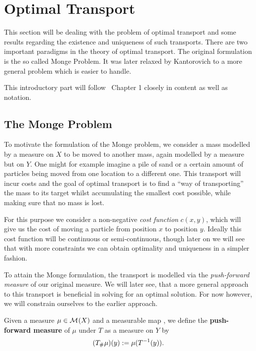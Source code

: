 \chapter{Optimal Transport}\label{OT}

This section will be dealing with the problem of optimal transport and some results regarding the existence and uniqueness of such transports. There are two important paradigms in the theory of optimal transport. The original formulation is the so called Monge Problem. It was later relaxed by Kantorovich to a more general problem which is easier to handle.

This introductory part will follow~\cite{San2015} Chapter 1 closely in content as well as notation.

\section{The Monge Problem}\label{TheMonProb}
To motivate the formulation of the Monge problem, we consider a mass modelled by a measure on $X$ to be moved to another mass, again modelled by a measure but on $Y$. One might for example imagine a pile of sand or a certain amount of particles being moved from one location to a different one. This transport will incur costs and the goal of optimal transport is to find a ``way of transporting'' the mass to its target whilst accumulating the smallest cost possible, while making sure that no mass is lost.

For this purpose we consider a non-negative \textit{cost function} $c(x, y)$, which will give us the cost of moving a particle from position $x$ to position $y$. Ideally this cost function will be continuous or semi-continuous, though later on we will see that with more constraints we can obtain optimality and uniqueness in a simpler fashion.

To attain the Monge formulation, the transport is modelled via the \textit{push-forward measure} of our original measure. We will later see, that a more general approach to this transport is beneficial in solving for an optimal solution. For now however, we will constrain ourselves to the earlier approach.

\begin{definition}\label{PushForward}
	Given a measure $\mu \in \mathcal{M}_{}(X)$ and a measurable map , we define the \textbf{push-forward measure} of $\mu$ under $T$ as a measure on $Y$ by
	\[ ({T}_{\#} \mu)(y) := \mu(T^{-1} (y)). \]
\end{definition}

